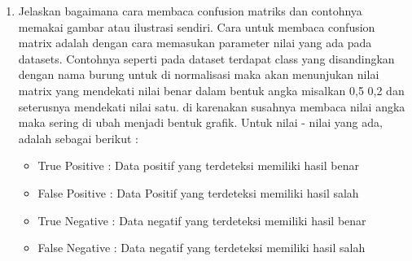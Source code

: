 \begin{enumerate}
\item Jelaskan bagaimana cara membaca confusion matriks dan contohnya memakai gambar atau ilustrasi sendiri.
Cara untuk membaca confusion matrix adalah dengan cara memasukan parameter nilai yang ada pada datasets. Contohnya seperti pada dataset terdapat class yang disandingkan dengan nama burung untuk di normalisasi maka akan menunjukan nilai matrix yang mendekati nilai benar dalam bentuk angka misalkan 0,5 0,2 dan seterusnya mendekati nilai satu. di karenakan susahnya membaca nilai angka maka sering di ubah menjadi bentuk grafik. Untuk nilai - nilai yang ada, adalah sebagai berikut : 
\begin{itemize}
    \item True Positive : Data positif yang terdeteksi memiliki hasil benar
    \item False Positive : Data Positif yang terdeteksi memiliki hasil salah
    \item True Negative : Data negatif yang terdeteksi memiliki hasil benar
    \item False Negative : Data negatif yang terdeteksi memiliki hasil salah
\end{itemize}


\end{enumerate}
